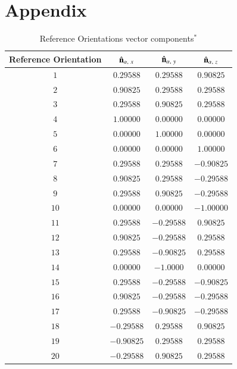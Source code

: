 \documentclass[final, 3p]{elsarticle}
\begin{document}
\newpage
\appendix
\onecolumn
\section*{Appendix}
\setcounter{table}{0}
\renewcommand{\thetable}{A\arabic{table}}
\label{sec:App1}
\begin{table}[h]
\begin{center}
\caption{\label{tab:A1}
%
Reference Orientations vector components$^*$}
\begin{tabular}{|c|c|c|c|}
\hline\hline
Reference Orientation & $\hat{\bf n}_{\alpha,\ x}$ &  $\hat{\bf n}_{\alpha,\ y}$ &  $\hat{\bf n}_{\alpha,\ z}$ \\
\hline
$1$  & $ 0.29588$ &  $ 0.29588$ & $ 0.90825$ \\
$2$  & $ 0.90825$ &  $ 0.29588$ & $ 0.29588$ \\
$3$  & $ 0.29588$ &  $ 0.90825$ & $ 0.29588$ \\
$4$  & $ 1.00000$ &  $ 0.00000$ & $ 0.00000$ \\
$5$  & $ 0.00000$ &  $ 1.00000$ & $ 0.00000$ \\
$6$  & $ 0.00000$ &  $ 0.00000$ & $ 1.00000$ \\
$7$  & $ 0.29588$ &  $ 0.29588$ & $-0.90825$ \\
$8$  & $ 0.90825$ &  $ 0.29588$ & $-0.29588$ \\
$9$  & $ 0.29588$ &  $ 0.90825$ & $-0.29588$ \\
$10$ & $ 0.00000$ &  $ 0.00000$ & $-1.00000$ \\
$11$ & $ 0.29588$ &  $-0.29588$ & $ 0.90825$ \\
$12$ & $ 0.90825$ &  $-0.29588$ & $ 0.29588$ \\
$13$ & $ 0.29588$ &  $-0.90825$ & $ 0.29588$ \\
$14$ & $ 0.00000$ &  $ -1.0000$ & $ 0.00000$ \\
$15$ & $ 0.29588$ &  $-0.29588$ & $-0.90825$ \\
$16$ & $ 0.90825$ &  $-0.29588$ & $-0.29588$ \\
$17$ & $ 0.29588$ &  $-0.90825$ & $-0.29588$ \\
$18$ & $-0.29588$ &  $ 0.29588$ & $ 0.90825$ \\
$19$ & $-0.90825$ &  $ 0.29588$ & $ 0.29588$ \\
$20$ & $-0.29588$ &  $ 0.90825$ & $ 0.29588$ \\

\end{tabular}
\end{center}
\end{table}
\end{document}
